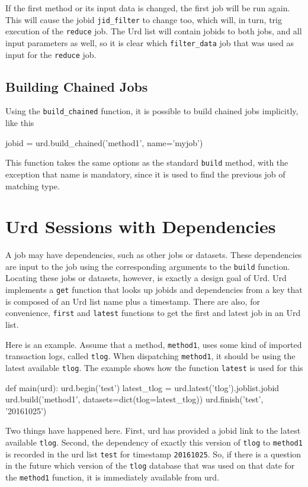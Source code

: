 If the first method or its input data is changed, the first job will
be run again.  This will cause the jobid \texttt{jid\_filter} to
change too, which will, in turn, trig execution of the \texttt{reduce}
job.  The Urd list will contain jobids to both jobs, and all input
parameters as well, so it is clear which \texttt{filter\_data} job
that was used as input for the \texttt{reduce} job.



\subsection{Building Chained Jobs}

Using the \texttt{build\_chained} function, it is possible to build
chained jobs implicitly, like this
\begin{python}
jobid = urd.build_chained('method1', name='myjob')
\end{python}
This function takes the same options as the standard \texttt{build}
method, with the exception that name is mandatory, since it is used to
find the previous job of matching type.






\section{Urd Sessions with Dependencies}

A job may have dependencies, such as other jobs or datasets.  These
dependencies are input to the job using the corresponding arguments to
the \texttt{build} function.  Locating these jobs or datasets,
however, is exactly a design goal of Urd.  Urd implements a
\texttt{get} function that looks up jobids and dependencies from a key
that is composed of an Urd list name plus a timestamp.  There are
also, for convenience, \texttt{first} and \texttt{latest} functions to
get the first and latest job in an Urd list.

Here is an example.  Assume that a method, \texttt{method1}, uses some
kind of imported transaction logs, called \texttt{tlog}.  When
dispatching \texttt{method1}, it should be using the latest available
\texttt{tlog}.  The example shows how the function \texttt{latest} is
used for this
\begin{python}
def main(urd):
  urd.begin('test')
  latest_tlog = urd.latest('tlog').joblist.jobid
  urd.build('method1', datasets=dict(tlog=latest_tlog))
  urd.finish('test', '20161025')
\end{python}
Two things have happened here.  First, urd has provided a jobid link
to the latest available \texttt{tlog}.  Second, the dependency of
exactly this version of \texttt{tlog} to \texttt{method1} is recorded
in the urd list \texttt{test} for timestamp \texttt{20161025}.  So, if
there is a question in the future which version of the \texttt{tlog}
database that was used on that date for the \texttt{method1} function,
it is immediately available from urd.

